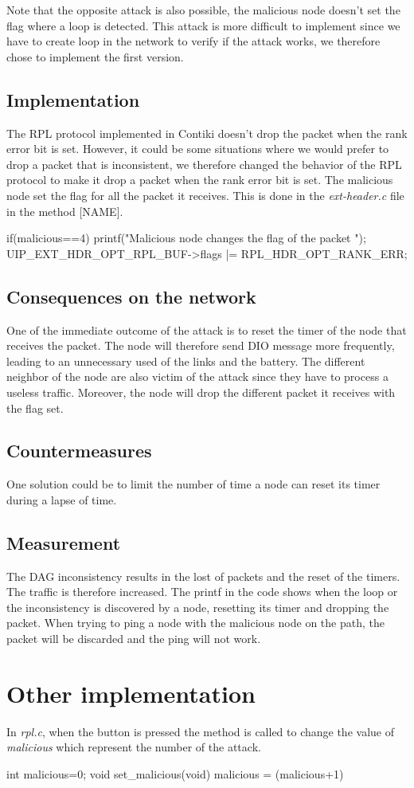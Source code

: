 \documentclass{report}
\begin{document}
Note that the opposite attack is also possible, the malicious node
doesn't set the flag where a loop is detected. This attack is more
difficult to implement since we have to create loop in the network to
verify if the attack works, we therefore chose to implement the first
version.

\subsection*{Implementation}
The RPL protocol implemented in Contiki doesn't drop the packet when the rank error bit is set. However, it could be some situations where we would prefer to drop a packet that is inconsistent, we therefore changed the behavior of the RPL protocol to make it drop a packet when the rank error bit is set. The malicious node set the flag for all the packet it receives. This is done in the \textit{ext-header.c} file in the method [NAME].

\begin{myc}
if(malicious==4){
	printf("Malicious node changes the flag of the packet \n");
	UIP_EXT_HDR_OPT_RPL_BUF->flags |= RPL_HDR_OPT_RANK_ERR;
}

\end{myc}
\subsection*{Consequences on the network}
One of the immediate outcome of the attack is to reset the timer of the
node that receives the packet. The node will therefore send DIO message
more frequently, leading to an unnecessary used of the links and the
battery. The different neighbor of the node are also victim of the
attack since they have to process a useless traffic. Moreover, the node
will drop the different packet it receives with the flag set.

\subsection*{Countermeasures}

One solution could be to limit the number of time a node can reset its timer during a lapse of time. 


\subsection*{Measurement}
The DAG inconsistency results in the lost of packets and the reset of
the timers. The traffic is therefore increased. The printf in the code
shows when the loop or the inconsistency is discovered by a node,
resetting its timer and dropping the packet. When trying to ping a node
with the malicious node on the path, the packet will be discarded and
the ping will not work. 

\section{Other implementation}
In \textit{rpl.c}, when the button is pressed the method is called to
change the value of \textit{malicious} which represent the number of the
attack.

\begin{myc}
int malicious=0;
void
set_malicious(void){
	malicious = (malicious+1)%
}
\end{myc}
\end{document}
